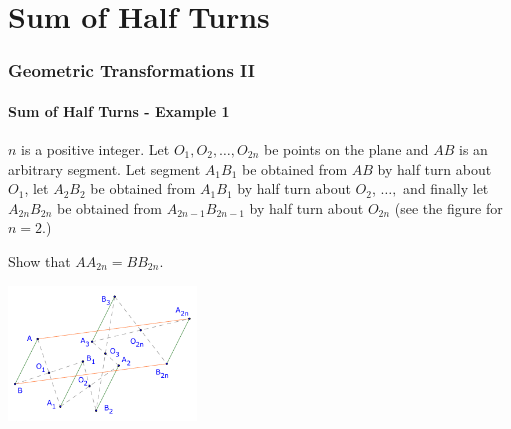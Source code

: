 \documentclass[8pt,xcolor=table,dvipsnames]{beamer}
\begin{document}
\section{Sum of Half Turns}

\begin{frame}[t]
    \frametitle{Geometric Transformations II}
    \framesubtitle{Sum of Half Turns - Example 1}
    \begin{example}
        $n$ is a positive integer. Let $O_1, O_2, \ldots, O_{2n}$ be points on the plane and $AB$ is an arbitrary segment.
        Let segment $A_1B_1$ be obtained from $AB$ by half turn about $O_1$, let $A_2B_2$ be obtained from $A_1B_1$ by half turn about $O_2$, $\ldots,$
        and finally let $A_{2n}B_{2n}$ be obtained from $A_{2n-1}B_{2n-1}$ by half turn about $O_{2n}$ (see the figure for $n=2.$)

        \bigbreak
        Show that $AA_{2n} = BB_{2n}.$
    \end{example}

    \begin{center}
        \includegraphics[width=5cm]{./svg/pdf/translation-1.pdf}
    \end{center}
\end{frame}
\end{document}
